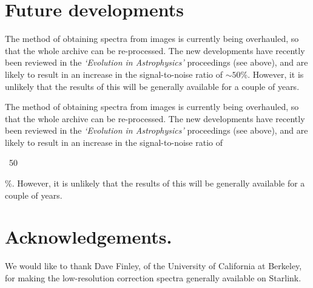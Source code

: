 \section{Future developments}

\begin{latexonly}
The method of obtaining spectra from images is currently being overhauled, so
that the whole archive can be re-processed.  The new developments have recently
been reviewed in the {\em `Evolution in Astrophysics'} proceedings (see above),
and are likely to result in an increase in the signal-to-noise ratio of $\sim
50$\%.  However, it is unlikely that the results of this will be generally
available for a couple of years.
\end{latexonly}

\begin{htmlonly}
The method of obtaining spectra from images is currently being overhauled, so
that the whole archive can be re-processed.  The new developments have recently
been reviewed in the {\em `Evolution in Astrophysics'} proceedings (see above),
and are likely to result in an increase in the signal-to-noise ratio of
\begin{rawhtml}~50\end{rawhtml}\%.  However, it is unlikely that the results of
this will be generally available for a couple of years.
\end{htmlonly}

\section*{Acknowledgements.}

We would like to thank Dave Finley, of the University of California at
Berkeley, for making the low-resolution correction spectra generally
available on Starlink.

\typeout{  }
\typeout{*****************************************************}
\typeout{  }
\typeout{  }
\typeout{*****************************************************}
\typeout{  }


